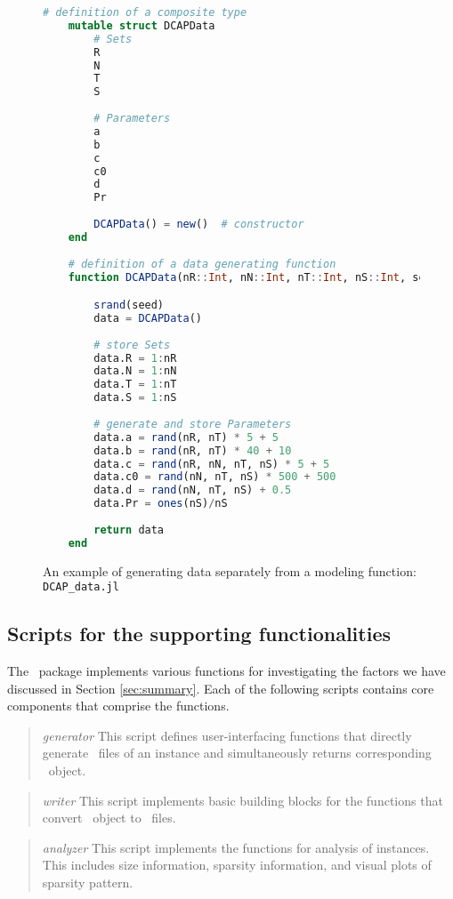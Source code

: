 \begin{figure}[]
	\centering
	\begin{lstlisting}[frame=single,language=julia]
	# definition of a composite type
	mutable struct DCAPData	
		# Sets
		R   
		N  
		T   
		S  
		
		# Parameters
		a   
		b   
		c  
		c0  
		d   
		Pr  
		
		DCAPData() = new()	# constructor
	end
	
	# definition of a data generating function
	function DCAPData(nR::Int, nN::Int, nT::Int, nS::Int, seed::Int)::DCAPData

		srand(seed)
		data = DCAPData()
		
		# store Sets
		data.R = 1:nR	
		data.N = 1:nN	
		data.T = 1:nT	
		data.S = 1:nS	
		
		# generate and store Parameters
		data.a = rand(nR, nT) * 5 + 5
		data.b = rand(nR, nT) * 40 + 10	
		data.c = rand(nR, nN, nT, nS) * 5 + 5	
		data.c0 = rand(nN, nT, nS) * 500 + 500	
		data.d = rand(nN, nT, nS) + 0.5	
		data.Pr = ones(nS)/nS
		
		return data
	end
	\end{lstlisting}
	\caption{An example of generating data separately from a modeling function: \texttt{DCAP\_data.jl}}
	\label{fig:DCAP_data.jl}
\end{figure}

\subsection{Scripts for the supporting functionalities}
The \siplibtwo\ package implements various functions for investigating the factors we have discussed in Section \ref{sec:summary}. Each of the following scripts contains core components that comprise the functions.
\begin{quotation}
	\noindent\textit{generator} This script defines user-interfacing functions that directly generate \smps\ files of an instance and simultaneously returns corresponding \jumpmodel\ object.
\end{quotation}

\begin{quotation}
	\noindent\textit{writer} This script implements basic building blocks for the functions that convert \jumpmodel\ object to \smps\ files. 
\end{quotation}

\begin{quotation}
	\noindent\textit{analyzer} This script implements the functions for analysis of instances. This includes size information, sparsity information, and visual plots of sparsity pattern.
\end{quotation}

